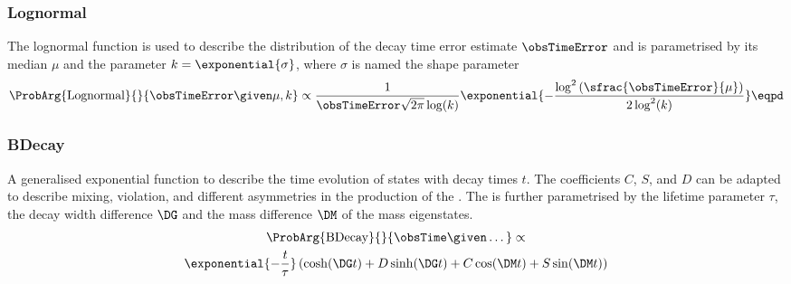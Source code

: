 \subsubsection{Lognormal}
\label{sec:measurement_of_sin2beta:likelihood_fit:pdfs:lognormal}

The lognormal function is \eg used to describe the distribution of the decay
time error estimate $\obsTimeError$ and is parametrised by its median $\mu$ and
the parameter $k = \exponential{\sigma}$, where $\sigma$ is named the shape
parameter
%
\begin{equation}\label{eq:measurement_of_sin2beta:likelihood_fit:pdfs:lognormal}
  \ProbArg{\text{Lognormal}}{}{\obsTimeError \given \mu, k} \propto \frac{1}{\obsTimeError \sqrt{2\pi} \log (k)} \exponential{-\frac{\log^2 \left(\sfrac{\obsTimeError}{\mu}\right)}{2 \log^2(k)}}\eqpd
\end{equation}

\subsubsection{BDecay}
\label{sec:measurement_of_sin2beta:likelihood_fit:pdfs:bdecay}

A generalised exponential function to describe the time evolution of \Bmeson
states with decay times $t$. The coefficients $C$, $S$, and $D$ can be
adapted to describe \Bmeson mixing, \CP violation, and different asymmetries \eg
in the production of the \Bmesons. The \PDF is further parametrised by the
lifetime parameter $\tau$, the decay width difference $\DG$ and the mass
difference $\DM$ of the \Bmeson mass eigenstates.
%
\begin{multline}\label{eq:measurement_of_sin2beta:likelihood_fit:pdfs:bdecay}
  \ProbArg{\text{BDecay}}{}{\obsTime \given \dots} \propto \\ \exponential{- \frac{t}{\tau}}\left( \cosh (\DG t) + D \sinh (\DG t) + C \cos (\DM t) + S \sin (\DM t) \right)
\end{multline}

\subsubsection{\Ipatia}
\label{sec:measurement_of_sin2beta:likelihood_fit:pdfs:ipatia}

